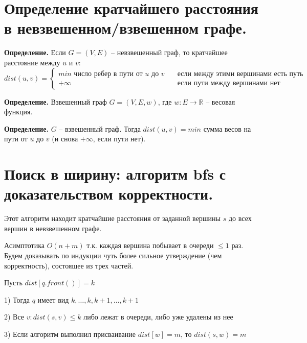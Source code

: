 \setcounter{section}{43}
\section{Определение кратчайшего расстояния в невзвешенном/взвешенном графе.}

\textbf{Определение.} Если $G = (V, E)$ -- невзвешенный граф, то кратчайшее расстояние между $u$ и $v$:
\[ dist(u, v) =
  \begin{cases}
    min \text{ число ребер в пути от } u \text{ до } v & \quad \text{если между этими вершинами есть путь}\\
    +\infty & \quad \text{если пути между вершинами нет}
  \end{cases}
\]

\textbf{Определение.} Взвешенный граф $G = (V, E, w)$, где $w: E \to \mathbb{R}$ -- весовая функция.

\textbf{Определение.} $G$ -- взвешенный граф. Тогда $dist(u, v) = min$ сумма весов на пути от $u$ до $v$ (и снова $+\infty$, если пути нет). 

\setcounter{section}{44}
\section{Поиск в ширину: алгоритм bfs с доказательством корректности.}

Этот алгоритм находит кратчайшие расстояния от заданной вершины $s$ до всех вершин в невзвешенном графе.



Асимптотика $O(n + m)$ т.к. каждая вершина побывает в очереди $\leq 1$ раз.\\

Будем доказывать по индукции чуть более сильное утверждение (чем корректность), состоящее из трех частей.\\
\begin{theorem}
Пусть $dist[q.front()] = k$

1) Тогда $q$ имеет вид $k, \dotsc, k, k + 1, \dotsc, k + 1$

2) Все $v : dist(s, v) \leq k$ либо лежат в очереди, либо уже удалены из нее

3) Если алгоритм выполнил присваивание $dist[w] = m$, то $dist(s, w) = m$\\
\end{theorem}

